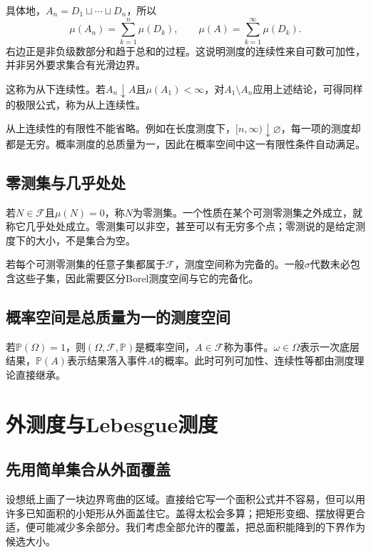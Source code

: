 具体地，$A_n=D_1\sqcup\cdots\sqcup D_n$，所以
\[
 \mu(A_n)=\sum_{k=1}^n\mu(D_k),\qquad
 \mu(A)=\sum_{k=1}^{\infty}\mu(D_k).
\]
右边正是非负级数部分和趋于总和的过程。这说明测度的连续性来自可数可加性，并非另外要求集合有光滑边界。

这称为从下连续性。若$A_n\downarrow A$且$\mu(A_1)<\infty$，对$A_1\setminus A_n$应用上述结论，可得同样的极限公式，称为从上连续性。

从上连续性的有限性不能省略。例如在长度测度下，$[n,\infty)\downarrow\varnothing$，每一项的测度却都是无穷。概率测度的总质量为一，因此在概率空间中这一有限性条件自动满足。

\subsection{零测集与几乎处处}

若$N\in\mathcal F$且$\mu(N)=0$，称$N$为零测集。一个性质在某个可测零测集之外成立，就称它几乎处处成立。零测集可以非空，甚至可以有无穷多个点；零测说的是给定测度下的大小，不是集合为空。

若每个可测零测集的任意子集都属于$\mathcal F$，测度空间称为完备的。一般$\sigma$代数未必包含这些子集，因此需要区分Borel测度空间与它的完备化。

\subsection{概率空间是总质量为一的测度空间}

若$\mathbb P(\Omega)=1$，则$(\Omega,\mathscr F,\mathbb P)$是概率空间，$A\in\mathscr F$称为事件。$\omega\in\Omega$表示一次底层结果，$\mathbb P(A)$表示结果落入事件$A$的概率。此时可列可加性、连续性等都由测度理论直接继承。

\section{外测度与Lebesgue测度}

\subsection{先用简单集合从外面覆盖}

设想纸上画了一块边界弯曲的区域。直接给它写一个面积公式并不容易，但可以用许多已知面积的小矩形从外面盖住它。盖得太松会多算；把矩形变细、摆放得更合适，便可能减少多余部分。我们考虑全部允许的覆盖，把总面积能降到的下界作为候选大小。

